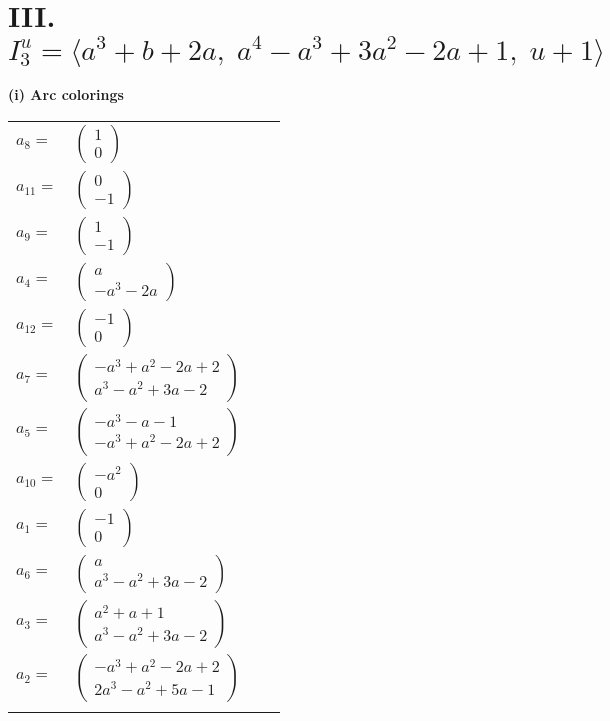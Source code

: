 \documentclass[1p]{elsarticle_modified}
\theoremstyle{definition}
\begin{document}
\centering \section*{III. $I^u_{3}= \langle a^3+b+2 a,\;a^4- a^3+3 a^2-2 a+1,\;u+1 \rangle$}
\flushleft \textbf{(i) Arc colorings}\\
\begin{tabular}{m{7pt} m{180pt} m{7pt} m{180pt} }
\flushright $a_{8}=$&$\begin{pmatrix}1\\0\end{pmatrix}$ \\
\flushright $a_{11}=$&$\begin{pmatrix}0\\-1\end{pmatrix}$ \\
\flushright $a_{9}=$&$\begin{pmatrix}1\\-1\end{pmatrix}$ \\
\flushright $a_{4}=$&$\begin{pmatrix}a\\- a^3-2 a\end{pmatrix}$ \\
\flushright $a_{12}=$&$\begin{pmatrix}-1\\0\end{pmatrix}$ \\
\flushright $a_{7}=$&$\begin{pmatrix}- a^3+a^2-2 a+2\\a^3- a^2+3 a-2\end{pmatrix}$ \\
\flushright $a_{5}=$&$\begin{pmatrix}- a^3- a-1\\- a^3+a^2-2 a+2\end{pmatrix}$ \\
\flushright $a_{10}=$&$\begin{pmatrix}- a^2\\0\end{pmatrix}$ \\
\flushright $a_{1}=$&$\begin{pmatrix}-1\\0\end{pmatrix}$ \\
\flushright $a_{6}=$&$\begin{pmatrix}a\\a^3- a^2+3 a-2\end{pmatrix}$ \\
\flushright $a_{3}=$&$\begin{pmatrix}a^2+a+1\\a^3- a^2+3 a-2\end{pmatrix}$ \\
\flushright $a_{2}=$&$\begin{pmatrix}- a^3+a^2-2 a+2\\2 a^3- a^2+5 a-1\end{pmatrix}$\\&\end{tabular}
\end{document}
